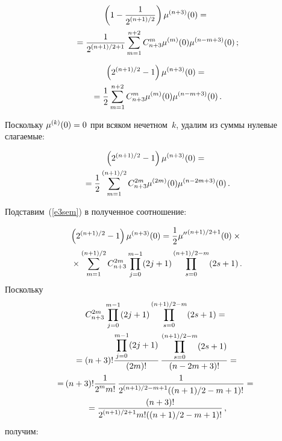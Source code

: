 \begin{multicols}{2}
{\begin{enumerate}[1.]
\vspace*{-13pt}

  \noindent
  \begin{multline*}
  \left( 1-\displaystyle\frac{\displaystyle 1\mathstrut}{\displaystyle 2^{(n+1)/2}\mathstrut}\right) \mu^{(n+3)}(0)={}\\
  {}=\displaystyle\frac{\displaystyle 1\mathstrut}{\displaystyle 2^{(n+1)/2+1}\mathstrut}  \sum\limits_{m=1}^{n+2} C^m_{n+3}\mu^{(m)}(0)\mu^{(n-m+3)}(0)\,;
  \end{multline*}
  
  \vspace*{-13pt}
  
  \noindent
  \begin{multline*}
  \left( 2^{(n+1)/2}-1\right) \mu^{(n+3)}(0)={}\\
  {}=\displaystyle\frac{\displaystyle 1\mathstrut}{\displaystyle 2\mathstrut}\sum\limits_{m=1}^{n+2} 
C^m_{n+3} \mu^{(m)}(0) \mu^{(n-m+3)}(0)\,.
  \end{multline*}
  
  Поскольку $\mu^{(k)}(0)\hm=0$ при всяком нечетном~$k$, удалим из суммы 
нулевые слагаемые:

\noindent
  \begin{multline*}
  \left( 2^{(n+1)/2}-1\right) \mu^{(n+3)}(0) ={}\\
  {}=\displaystyle\frac{\displaystyle 1\mathstrut}{\displaystyle 2\mathstrut}\sum\limits_{m=1}^{(n+1)/2} C_{n+3}^{2m} \mu^{(2m)}(0)\mu^{(n-
2m+3)}(0)\,.
  \end{multline*}
  
  Подставим~(\ref{e3sem}) в полученное соотношение:
  
  \noindent
  \begin{multline*}
  \left( 2^{(n+1)/2}-1\right) 
\mu^{(n+3)}(0)=
\displaystyle\frac{\displaystyle 1\mathstrut}{\displaystyle 2\mathstrut}{\mu^{\prime\prime}}^{(n+1)/2+1}(0) \times{}\\
{}\times
\sum\limits_{m=1}^{(n+1)/2} C^{2m}_{n+3} \prod\limits_{j=0}^{m-1} (2j+1) 
\prod\limits_{s=0}^{(n+1)/2-m} (2s+1)\,.
  \end{multline*}
  Поскольку 
  \begin{multline*}
  C^{2m}_{n+3} \prod\limits_{j=0}^{m-1}(2j+1) \prod\limits_{s=0}^{(n+1)/2-
m}(2s+1) ={}\\
{}= (n+3)!\displaystyle\frac{\displaystyle \prod\limits_{j=0}^{m-1}(2j+1)\mathstrut}{\displaystyle (2m)!\mathstrut}\, 
\displaystyle\frac{\displaystyle \prod_{s=0}^{(n+1)/2-m}(2s+1)\mathstrut}{\displaystyle (n-2m+3)!\mathstrut}= {}\\
\hspace*{-2.5pt}{}=\hspace*{-0.8pt}(n+3)! \displaystyle\frac{\displaystyle 1\mathstrut}{\displaystyle 2^m m!\mathstrut}\,\displaystyle\frac{\displaystyle 1\mathstrut}{\displaystyle 2^{(n+1)/2-m+1}((n+1)/2-m+1)!\mathstrut}={}\\
{}=\displaystyle\frac{\displaystyle (n+3)!\mathstrut}{\displaystyle 2^{(n+1)/2+1} m!((n+1)/2-m+1)!\mathstrut}\,,
  \end{multline*}
  получим:
  

\end{enumerate}}
\end{multicols}
